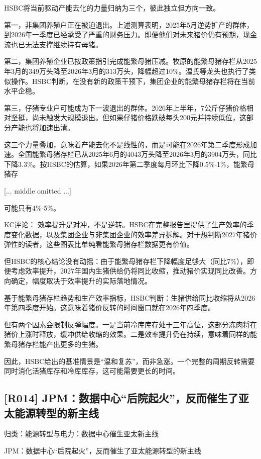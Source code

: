 \documentclass[11pt]{ctexart}
\begin{document}
HSBC将当前驱动产能去化的力量归纳为三个，彼此独立但方向一致。

第一，非集团养殖户正在被迫退出。上述测算表明，2025年5月逆势扩产的群体，到2026年一季度已经承受了严重的财务压力。即便他们对未来猪价仍有预期，现金流也已无法支撑继续持有母猪。

第二，集团养殖企业已按政策指引完成能繁母猪压减。牧原的能繁母猪存栏从2025年3月的349万头降至2026年3月的313万头，降幅超过10\%。温氏等龙头也执行了类似操作。HSBC判断，在没有新的政策干预下，集团企业的能繁母猪存栏将在当前水平企稳。

第三，仔猪专业户可能成为下一波退出的群体。2026年上半年，7公斤仔猪价格相对坚挺，尚未触发大规模退出。但如果仔猪价格跌破每头200元并持续低位，这部分产能也将加速出清。

这三个力量叠加，意味着产能去化不是线性的，而是可能在2026年第二季度形成加速。全国能繁母猪存栏已从2025年6月的4043万头降至2026年3月的3904万头，同比下降3.3\%。按HSBC的估算，如果2026年第二季度每月环比下降0.5\%-1\%，能繁母猪存

[... middle omitted ...]

可能只有4\%-5\%。

KC评论： 效率提升是对冲，不是逆转。HSBC在完整报告里提供了生产效率的季度变化数据，以及集团企业与非集团企业的效率差异拆解。对于想判断2027年猪价弹性的读者，这些图表比单纯看能繁母猪存栏数据更有价值。

但HSBC的核心结论没有动摇：由于能繁母猪存栏下降幅度足够大（同比7\%），即便考虑效率提升，2027年国内生猪供给仍将同比收缩，推动猪价实现同比改善。方向确定，幅度取决于效率提升的实际落地情况。

基于能繁母猪存栏趋势和生产效率指标，HSBC判断：生猪供给同比收缩将从2026年第四季度开始。这意味着猪价反转的时间窗口就在2026年四季度。

但有两个因素会限制反弹幅度。一是当前冷库库存处于三年高位，这部分冻肉将在猪价上涨时释放，缓冲供给收缩的效果。二是效率提升仍在持续，意味着同样的能繁母猪存栏能产出更多的生猪。

因此，HSBC给出的基准情景是“温和复苏”，而非急涨。一个完整的周期反转需要同时消化活猪库存和冷库库存，这可能需要更长的时间。

\subsection{[R014] JPM：数据中心“后院起火”，反而催生了亚太能源转型的新主线}
{\small\color{refgray}归类：能源转型与电力：数据中心催生亚太新主线}

JPM：数据中心“后院起火”，反而催生了亚太能源转型的新主线
\end{document}
